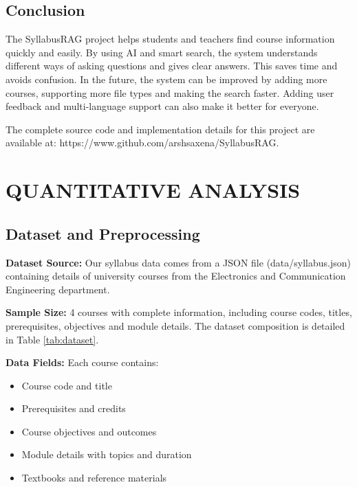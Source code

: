 \documentclass[conference]{IEEEtran}
\begin{document}
\subsection{\textbf{Conclusion}}

The SyllabusRAG project helps students and teachers find course information quickly and easily. By using AI and smart search, the system understands different ways of asking questions and gives clear answers. This saves time and avoids confusion. In the future, the system can be improved by adding more courses, supporting more file types and making the search faster. Adding user feedback and multi-language support can also make it better for everyone.

The complete source code and implementation details for this project are available at: https://www.github.com/arshsaxena/SyllabusRAG.

\section{\textbf{QUANTITATIVE ANALYSIS}}

\subsection{\textbf{Dataset and Preprocessing}}

\textbf{Dataset Source:} Our syllabus data comes from a JSON file (data/syllabus.json) containing details of university courses from the Electronics and Communication Engineering department.

\textbf{Sample Size:} 4 courses with complete information, including course codes, titles, prerequisites, objectives and module details. The dataset composition is detailed in Table \ref{tab:dataset}.

\textbf{Data Fields:} Each course contains:
\begin{itemize}
    \item Course code and title
    \item Prerequisites and credits
    \item Course objectives and outcomes
    \item Module details with topics and duration
    \item Textbooks and reference materials
\end{itemize}
\end{document}
